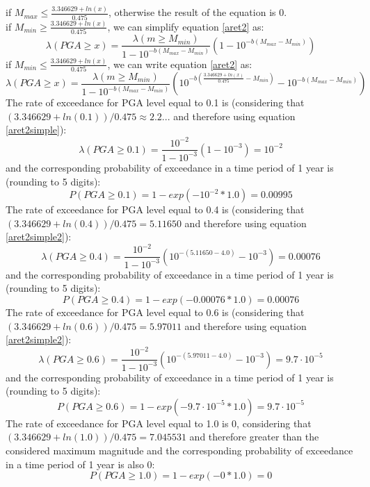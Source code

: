 %
if $M_{max} \leq  \frac{3.346629 + ln(x)}{0.475}$, otherwise the result of the
equation is 0.\\ if $M_{min} \geq  \frac{3.346629 + ln(x)}{0.475}$, we can
simplify equation \ref{aret2} as:
%
\begin{equation}
\label{aret2simple}
\lambda(PGA \geq x) =  \frac{\lambda(m\geq M_{min})}{1 - 10^{-b(M_{max} - M_{min})}} (1 - 10^{-b(M_{max} - M_{min})})
\end{equation}
if $M_{min} \leq  \frac{3.346629 + ln(x)}{0.475}$, we can write equation \ref{aret2} as:
\begin{equation}
\label{aret2simple2}
\lambda(PGA \geq x) =  \frac{\lambda(m\geq M_{min})}{1 - 10^{-b(M_{max} - M_{min})}} (10^{-b( \frac{3.346629 + ln(x)}{0.475} - M_{min})} - 10^{-b(M_{max} - M_{min})})
\end{equation}
%
The rate of exceedance for PGA level equal to 0.1 is (considering that
$(3.346629 +ln(0.1)) / 0.475 \approx 2.2...$ and therefore using equation
\ref{aret2simple}):
%
\begin{equation}
\lambda(PGA \geq 0.1) =  \frac{10^{-2}}{1 - 10^{-3}} (1 - 10^{-3}) = 10^{-2}
\end{equation}
and the corresponding probability of exceedance in a time period of 1 year is (rounding to 5 digits):
\begin{equation}
P(PGA \geq 0.1) = 1 - exp(- 10^{-2} * 1.0) = 0.00995
\end{equation}
The rate of exceedance for PGA level equal to 0.4 is (considering that  $(3.346629 +ln(0.4)) / 0.475 = 5.11650$ and therefore using equation \ref{aret2simple2}):
\begin{equation}
\lambda(PGA \geq 0.4) =  \frac{10^{-2}}{1 - 10^{-3}} (10^{-(5.11650 - 4.0)} - 10^{-3}) = 0.00076
\end{equation}
and the corresponding probability of exceedance in a time period of 1 year is (rounding to 5 digits):
\begin{equation}
P(PGA \geq 0.4) = 1 - exp(- 0.00076 * 1.0) = 0.00076
\end{equation}
The rate of exceedance for PGA level equal to 0.6 is (considering that  $(3.346629 +ln(0.6)) / 0.475 = 5.97011$ and therefore using equation \ref{aret2simple2}):
\begin{equation}
\lambda(PGA \geq 0.6) =  \frac{10^{-2}}{1 - 10^{-3}} (10^{-(5.97011 - 4.0)} - 10^{-3}) = 9.7 \cdot 10^{-5}
\end{equation}
and the corresponding probability of exceedance in a time period of 1 year is (rounding to 5 digits):
\begin{equation}
P(PGA \geq 0.6) = 1 - exp(- 9.7 \cdot 10^{-5} * 1.0) = 9.7 \cdot 10^{-5}
\end{equation}
The rate of exceedance for PGA level equal to 1.0 is 0, considering that  
$(3.346629 +ln(1.0)) / 0.475 = 7.045531$ and therefore greater than the 
considered maximum magnitude and the corresponding probability of 
exceedance in a time period of 1 year is also 0:
\begin{equation}
P(PGA \geq 1.0) = 1 - exp(- 0 * 1.0) = 0
\end{equation}
%
\clearpage
%
